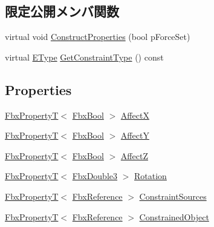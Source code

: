 \subsection*{限定公開メンバ関数}
\begin{DoxyCompactItemize}
\item 
virtual void \hyperlink{class_fbx_constraint_rotation_ad9f6469905777a18e3a383f402bdd9b0}{Construct\+Properties} (bool p\+Force\+Set)
\item 
virtual \hyperlink{class_fbx_constraint_a49c1634663395eab7c28856df233ec66}{E\+Type} \hyperlink{class_fbx_constraint_rotation_a8d9f54ac347d18a0871eafc21e88cb77}{Get\+Constraint\+Type} () const
\end{DoxyCompactItemize}
\subsection*{Properties}
\begin{DoxyCompactItemize}
\item 
\hyperlink{class_fbx_property_t}{Fbx\+PropertyT}$<$ \hyperlink{fbxtypes_8h_a92e0562b2fe33e76a242f498b362262e}{Fbx\+Bool} $>$ \hyperlink{class_fbx_constraint_rotation_a2fc6ae9614bcc41039d4abd37d3186aa}{AffectX}
\item 
\hyperlink{class_fbx_property_t}{Fbx\+PropertyT}$<$ \hyperlink{fbxtypes_8h_a92e0562b2fe33e76a242f498b362262e}{Fbx\+Bool} $>$ \hyperlink{class_fbx_constraint_rotation_a8b611c9fd76921a2780254dee0d33870}{AffectY}
\item 
\hyperlink{class_fbx_property_t}{Fbx\+PropertyT}$<$ \hyperlink{fbxtypes_8h_a92e0562b2fe33e76a242f498b362262e}{Fbx\+Bool} $>$ \hyperlink{class_fbx_constraint_rotation_af7a3d171bfeb0e5fa72d292756c64848}{AffectZ}
\item 
\hyperlink{class_fbx_property_t}{Fbx\+PropertyT}$<$ \hyperlink{fbxtypes_8h_ae0a96f14cde566774c7553aa7523b7a7}{Fbx\+Double3} $>$ \hyperlink{class_fbx_constraint_rotation_aa0bb0aa79b3f983ede4a376f12adb1c9}{Rotation}
\item 
\hyperlink{class_fbx_property_t}{Fbx\+PropertyT}$<$ \hyperlink{fbxtypes_8h_a44df6a2eec915cf27cd481e5c5e48a24}{Fbx\+Reference} $>$ \hyperlink{class_fbx_constraint_rotation_ac9bb2a7227a6034425e06395a03d57a6}{Constraint\+Sources}
\item 
\hyperlink{class_fbx_property_t}{Fbx\+PropertyT}$<$ \hyperlink{fbxtypes_8h_a44df6a2eec915cf27cd481e5c5e48a24}{Fbx\+Reference} $>$ \hyperlink{class_fbx_constraint_rotation_aee0715edab2a99b52a40f35aba1d662c}{Constrained\+Object}
\end{DoxyCompactItemize}
